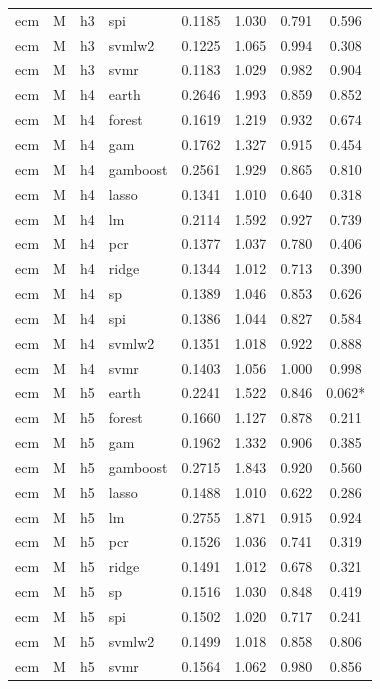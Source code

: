 \begin{ThreePartTable}
\begin{longtable}[t]{llclcccc}
ecm & M & h3 & spi & 0.1185 & 1.030 & 0.791 & 0.596\\
ecm & M & h3 & svmlw2 & 0.1225 & 1.065 & 0.994 & 0.308\\
ecm & M & h3 & svmr & 0.1183 & 1.029 & 0.982 & 0.904\\
\addlinespace
ecm & M & h4 & earth & 0.2646 & 1.993 & 0.859 & 0.852\\
ecm & M & h4 & forest & 0.1619 & 1.219 & 0.932 & 0.674\\
ecm & M & h4 & gam & 0.1762 & 1.327 & 0.915 & 0.454\\
ecm & M & h4 & gamboost & 0.2561 & 1.929 & 0.865 & 0.810\\
ecm & M & h4 & lasso & 0.1341 & 1.010 & 0.640 & 0.318\\
ecm & M & h4 & lm & 0.2114 & 1.592 & 0.927 & 0.739\\
ecm & M & h4 & pcr & 0.1377 & 1.037 & 0.780 & 0.406\\
ecm & M & h4 & ridge & 0.1344 & 1.012 & 0.713 & 0.390\\
ecm & M & h4 & sp & 0.1389 & 1.046 & 0.853 & 0.626\\
ecm & M & h4 & spi & 0.1386 & 1.044 & 0.827 & 0.584\\
ecm & M & h4 & svmlw2 & 0.1351 & 1.018 & 0.922 & 0.888\\
ecm & M & h4 & svmr & 0.1403 & 1.056 & 1.000 & 0.998\\
\addlinespace
ecm & M & h5 & earth & 0.2241 & 1.522 & 0.846 & 0.062*\\
ecm & M & h5 & forest & 0.1660 & 1.127 & 0.878 & 0.211\\
ecm & M & h5 & gam & 0.1962 & 1.332 & 0.906 & 0.385\\
ecm & M & h5 & gamboost & 0.2715 & 1.843 & 0.920 & 0.560\\
ecm & M & h5 & lasso & 0.1488 & 1.010 & 0.622 & 0.286\\
ecm & M & h5 & lm & 0.2755 & 1.871 & 0.915 & 0.924\\
ecm & M & h5 & pcr & 0.1526 & 1.036 & 0.741 & 0.319\\
ecm & M & h5 & ridge & 0.1491 & 1.012 & 0.678 & 0.321\\
ecm & M & h5 & sp & 0.1516 & 1.030 & 0.848 & 0.419\\
ecm & M & h5 & spi & 0.1502 & 1.020 & 0.717 & 0.241\\
ecm & M & h5 & svmlw2 & 0.1499 & 1.018 & 0.858 & 0.806\\
ecm & M & h5 & svmr & 0.1564 & 1.062 & 0.980 & 0.856\\

\end{longtable}
\end{ThreePartTable}
